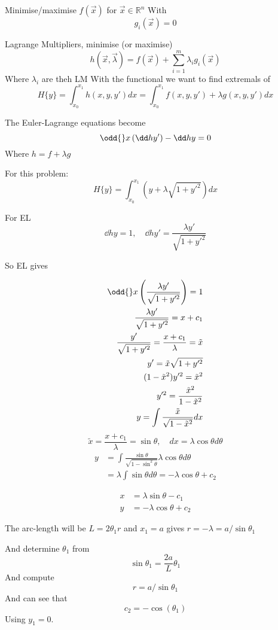 \documentclass{X:/Documents/Coding/Latex/myassignment}
\begin{document}
Minimise/maximise $f(\vec x)$ for $\vec x \in \mathbb{R}^n$
With
\[g_i(\vec x) = 0\]

Lagrange Multipliers, minimise (or maximise)
\[h(\vec x, \vec \lambda) = f(\vec x) + \sum_{i=1}^m \lambda_i g_i(\vec x)\]
Where $\lambda_i$ are theh LM
With the functional we want to find extremals of
\[H\{y\} = \int_{x_0}^{x_1} h(x,y,y') dx = \int_{x_0}^{x_1} f(x,y,y') + \lambda g(x,y,y') dx\]

The Euler-Lagrange equations become
\[\odd{}x \left(\dd h{y'}\right) - \dd hy = 0\]
Where $h = f + \lambda g$


For this problem:
\[H\{y\} = \int_{x_0}^{x_1} \left(y + \lambda \sqrt{1 + y'^2}\right) dx\]

For EL 
\[\dd hy = 1, \quad \dd h{y'} = \frac{\lambda y'}{\sqrt{1+y'^2}}\]

So EL gives

\begin{align*}
	\odd{}x \left(\frac{\lambda y'}{\sqrt{1+y'^2}}\right) = 1\\
		\frac{\lambda y'}{\sqrt{1+y'^2}} = x + c_1\\
		\frac{y'}{\sqrt{1+y'^2}} = \frac{x + c_1}{\lambda} = \tilde{x}\\
		y' = \tilde{x} \sqrt{1+y'^2}\\
		(1-\tilde{x}^2)y'^2 = \tilde{x}^2\\
		y'^2 = \frac{\tilde{x}^2}{1-\tilde{x}^{2}}\\
		y = \int \frac{\tilde{x}}{\sqrt{1-\tilde{x}^2}} dx\\
\end{align*}
\[\tilde{x} = \frac{x+c_1}{\lambda} = \sin\theta, \quad dx = \lambda \cos\theta d\theta\]
\begin{align*}
	y &= \int \frac{\sin\theta}{\sqrt{1-\sin^2\theta}} \lambda \cos\theta d\theta\\
	&= \lambda \int \sin\theta d\theta = - \lambda \cos\theta + c_2
\end{align*}

\begin{align*}
	x &= \lambda \sin\theta - c_1\\
	y &= - \lambda\cos\theta + c_2
\end{align*}

The arc-length will be $L = 2\theta_1r$ and $x_1 = a$ gives $r = -\lambda = a/\sin\theta_1$

And determine $\theta_1$ from 
\[\sin\theta_1 = \frac{2a}{L} \theta_1\]
And compute
\[r = a/\sin\theta_1\]
And can see that
\[c_2 = -\cos(\theta_1)\]
Using $y_1 = 0$.
\end{document}
